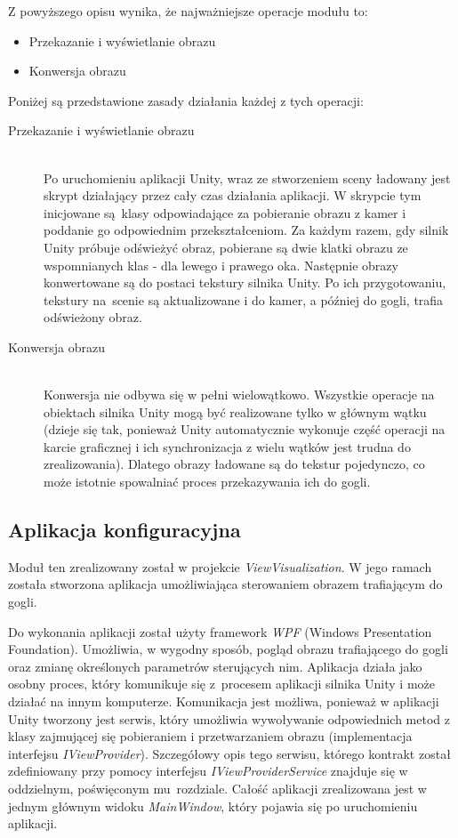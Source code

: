 \documentclass[a4paper,11pt,twoside]{report}
\theoremstyle{definition}
\begin{document}
Z powyższego opisu wynika, że najważniejsze operacje modułu to:
\begin{itemize}
\item Przekazanie i wyświetlanie obrazu
\item Konwersja obrazu
\end{itemize}

Poniżej są przedstawione zasady działania każdej z tych operacji:

\begin{description}
\item [Przekazanie i wyświetlanie obrazu] \hfill \\
Po uruchomieniu aplikacji Unity, wraz ze stworzeniem sceny ładowany jest skrypt działający przez cały czas działania aplikacji. W skrypcie tym inicjowane są~klasy odpowiadające za pobieranie obrazu z kamer i poddanie go odpowiednim przekształceniom. Za każdym razem, gdy silnik Unity próbuje odświeżyć obraz, pobierane są dwie klatki obrazu ze wspomnianych klas - dla lewego i prawego oka. Następnie obrazy konwertowane są do postaci tekstury silnika Unity. Po ich przygotowaniu, tekstury na~scenie są aktualizowane i do kamer, a później do gogli, trafia odświeżony obraz.
\item [Konwersja obrazu] \hfill \\
Konwersja nie odbywa się w pełni wielowątkowo. Wszystkie operacje na obiektach silnika Unity mogą być realizowane tylko w głównym wątku (dzieje się tak, ponieważ Unity automatycznie wykonuje część operacji na karcie graficznej i ich synchronizacja z wielu wątków jest trudna do zrealizowania). Dlatego obrazy ładowane są do tekstur pojedynczo, co może istotnie spowalniać proces przekazywania ich do gogli.
\end{description}

\subsection{Aplikacja konfiguracyjna}
Moduł ten zrealizowany został w projekcie \textit{ViewVisualization}. W jego ramach została stworzona aplikacja umożliwiająca sterowaniem obrazem trafiającym do gogli.

Do wykonania aplikacji został użyty framework \textit{WPF} (Windows Presentation Foundation). Umożliwia, w wygodny sposób, pogląd obrazu trafiającego do gogli oraz zmianę określonych parametrów sterujących nim. Aplikacja działa jako osobny proces, który komunikuje się z~procesem aplikacji silnika Unity i może działać na innym komputerze. Komunikacja jest możliwa, ponieważ w aplikacji Unity tworzony jest serwis, który umożliwia wywoływanie odpowiednich metod z klasy zajmującej się pobieraniem i przetwarzaniem obrazu (implementacja interfejsu \textit{IViewProvider}). Szczegółowy opis tego serwisu, którego kontrakt został zdefiniowany przy pomocy interfejsu \textit{IViewProviderService} znajduje się w oddzielnym, poświęconym mu~rozdziale. Całość aplikacji zrealizowana jest w jednym głównym widoku \textit{MainWindow}, który pojawia się po uruchomieniu aplikacji. 
\end{document}
